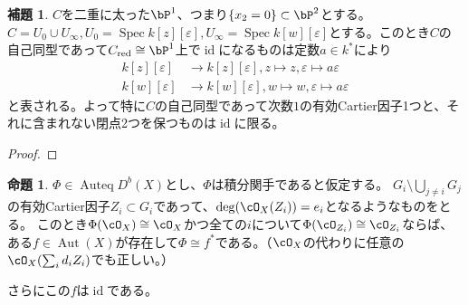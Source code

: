\documentclass[uplatex, a4paper, dvipdfmx]{jsarticle}
\theoremstyle{definition}
\newtheorem{definition}[theorem]{定義}
\newtheorem{proposition}[theorem]{命題}
\newtheorem{lemma}[theorem]{補題}
\DeclareMathOperator{\Auteq}{\mathrm{Auteq}}
\DeclareMathOperator{\id}{\mathrm{id}}
\DeclareMathOperator{\Aut}{\mathrm{Aut}}
\DeclareMathOperator{\Spec}{\mathrm{Spec}}
\DeclareMathOperator{\red}{\mathrm{red}}
\begin{document}
\begin{lemma}\label{lem:automorphism-of-double-line}
    $C$を二重に太った$\bP^1$、つまり$\{x_2 = 0\} \subset \bP^2$とする。$C = U_0 \cup U_\infty, U_0 = \Spec k[z][\varepsilon], U_\infty = \Spec k[w][\varepsilon]$とする。このとき$C$の自己同型であって$C_{\red} \cong \bP^1$上で$\id$になるものは定数$a \in k^*$により
    \begin{align}
        k[z][\varepsilon] & \to k[z][\varepsilon], z \mapsto z, \varepsilon \mapsto a\varepsilon \\
        k[w][\varepsilon] & \to k[w][\varepsilon], w \mapsto w, \varepsilon \mapsto a\varepsilon
    \end{align}
    と表される。よって特に$C$の自己同型であって次数$1$の有効Cartier因子1つと、それに含まれない閉点2つを保つものは$\id$に限る。
\end{lemma}
\begin{proof}

\end{proof}
\begin{proposition}\label{prop:pointwise-criterion}
    $\Phi \in \Auteq D^b(X)$とし、$\Phi$は積分関手であると仮定する。
    $G_i \setminus \bigcup_{j \neq i} G_j$の有効Cartier因子$Z_i \subset G_i$であって、$\deg(\cO_X(Z_i)) = e_i$となるようなものをとる。
    このとき$\Phi(\cO_X) \cong \cO_X$かつ全ての$i$について$\Phi(\cO_{Z_i}) \cong \cO_{Z_i}$ならば、ある$f \in \Aut(X)$が存在して$\Phi \cong f^*$である。（$\cO_X$の代わりに任意の$\cO_X(\sum_i d_iZ_i)$でも正しい。）

    さらにこの$f$は$\id$である。
\end{proposition}
\end{document}
